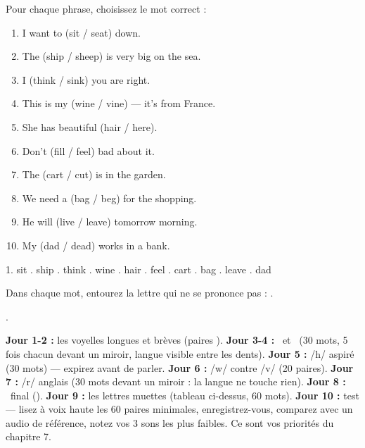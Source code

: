 \begin{exo}
Pour chaque phrase, choisissez le mot correct :
\begin{enumerate}
  \item I want to (sit / seat) down.
  \item The (ship / sheep) is very big on the sea.
  \item I (think / sink) you are right.
  \item This is my (wine / vine) --- it's from France.
  \item She has beautiful (hair / here).
  \item Don't (fill / feel) bad about it.
  \item The (cart / cut) is in the garden.
  \item We need a (bag / beg) for the shopping.
  \item He will (live / leave) tomorrow morning.
  \item My (dad / dead) works in a bank.
\end{enumerate}
\end{exo}
\begin{corrige}[5.3]
1. sit . ship . think . wine . hair . feel . cart . bag . leave . dad
\end{corrige}

\begin{exo}
Dans chaque mot, entourez la lettre qui ne se prononce pas :
.
\end{exo}
\begin{corrige}[5.4]
.
\end{corrige}

\begin{mission}
\textbf{Jour 1-2 :} les voyelles longues et brèves (paires ).
\textbf{Jour 3-4 :} \ipatheta\ et \ipadh\ (30 mots, 5 fois chacun devant un miroir, langue visible entre les dents).
\textbf{Jour 5 :} /h/ aspiré (30 mots) --- expirez avant de parler.
\textbf{Jour 6 :} /w/ contre /v/ (20 paires).
\textbf{Jour 7 :} /r/ anglais (30 mots devant un miroir : la langue ne touche rien).
\textbf{Jour 8 :} \ipang\ final ().
\textbf{Jour 9 :} les lettres muettes (tableau ci-dessus, 60 mots).
\textbf{Jour 10 :} test --- lisez à voix haute les 60 paires minimales, enregistrez-vous,
comparez avec un audio de référence, notez vos 3 sons les plus faibles. Ce sont vos
priorités du chapitre 7.
\end{mission}


